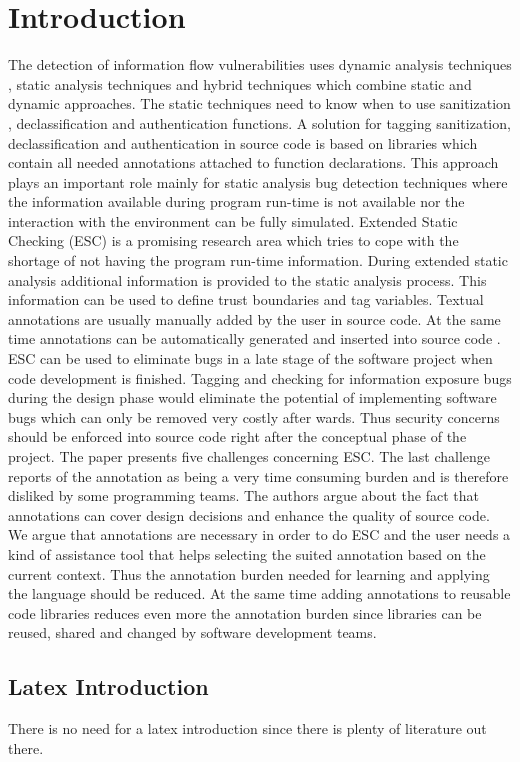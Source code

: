 \chapter{Introduction}
\label{chapter:Introduction}

The detection of information flow vulnerabilities uses dynamic analysis techniques , static analysis techniques and hybrid techniques which combine static and dynamic approaches. The static techniques need to know when to use  sanitization , declassification and authentication functions.
A solution for tagging sanitization, declassification and authentication in source code is based on libraries which contain all needed annotations attached to function declarations. This approach plays an important role mainly for static analysis bug detection techniques where the information available during program run-time is not available nor the interaction with the environment can be fully simulated.
Extended Static Checking (ESC) is a promising research area which tries to cope with the shortage of not having the program run-time information. During extended static analysis additional information is provided to the static analysis process. This information can be used to define trust boundaries and tag variables. Textual annotations are usually manually added by the user in source code. At the same time annotations can be automatically generated and inserted into source code . ESC can be used to eliminate bugs in a late stage of the software project when code development is finished. Tagging and checking for information exposure bugs during the design phase would eliminate the potential of implementing software bugs which can only be removed very costly after wards. Thus security concerns should be enforced into source code right after the conceptual phase of the project.
The paper presents five challenges concerning ESC. The last challenge reports of the annotation as being a very time consuming burden and is therefore disliked by some programming
teams. The authors argue about the fact that annotations can cover design decisions and enhance the quality of source code. We argue that annotations are necessary in order to do ESC and the user needs a kind of assistance tool that helps selecting the suited annotation based on the current context. Thus the annotation burden needed for learning and applying the language should be reduced. At the same time adding annotations to reusable code libraries reduces even more the annotation burden since libraries can be reused, shared and changed by software development
teams.
 
 
\section{Latex Introduction}
There is no need for a latex introduction since there is plenty of literature out there.
 



